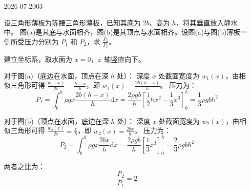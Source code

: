 \begin{mistake}{2026-07-20}{03}

\begin{problemcontent}
设三角形薄板为等腰三角形薄板，已知其底为 \(2b\)、高为 \(h\)，将其垂直放入静水中。
图(a)是其底与水面相齐，图(b)是其顶点与水面相齐。设图(a)与图(b)薄板一侧所受压力分别为 \(P_1\) 和 \(P_2\)，求 \(\frac{P_2}{P_1}\)。
\end{problemcontent}

\begin{solutioncontent}
建立坐标系，取水面为 \(x=0\)，\(x\) 轴竖直向下。

对于图(a)（底边在水面，顶点在深 \(h\) 处）：
深度 \(x\) 处截面宽度为 \(w_1(x)\)，由相似三角形可得 \(\frac{w_1(x)}{2b} = \frac{h-x}{h}\)，即 \(w_1(x) = \frac{2b(h-x)}{h}\)。
压力为：
\[
P_1 = \int_{0}^{h} \rho g x \frac{2b(h-x)}{h} \mathrm{d}x = \frac{2\rho g b}{h} \left[ \frac{1}{2}hx^2 - \frac{1}{3}x^3 \right]_0^h = \frac{1}{3}\rho g b h^2
\]

对于图(b)（顶点在水面，底边在深 \(h\) 处）：
深度 \(x\) 处截面宽度为 \(w_2(x)\)，由相似三角形可得 \(\frac{w_2(x)}{2b} = \frac{x}{h}\)，即 \(w_2(x) = \frac{2bx}{h}\)。
压力为：
\[
P_2 = \int_{0}^{h} \rho g x \frac{2bx}{h} \mathrm{d}x = \frac{2\rho g b}{h} \left[ \frac{1}{3}x^3 \right]_0^h = \frac{2}{3}\rho g b h^2
\]

两者之比为：
\[
\frac{P_2}{P_1} = 2
\]
\end{solutioncontent}


\end{mistake}
